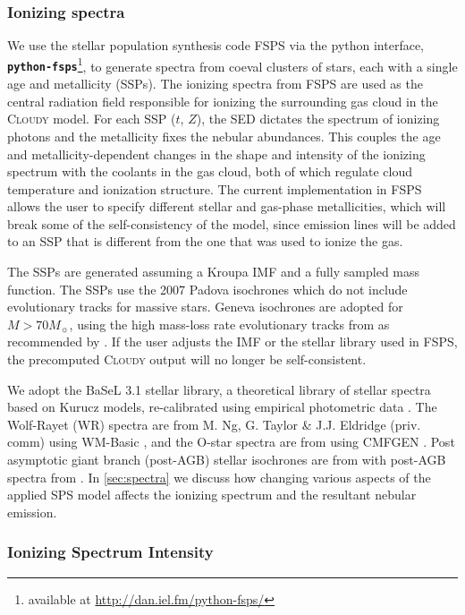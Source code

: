 \documentclass[trackchanges, twocolumn, tighten]{aastex61}
\newcommand{\Sec}[1]{\autoref{sec:#1}}
\newcommand{\FSPS}{{\sc FSPS}\xspace}
\newcommand{\pFSPS}{{\tt \textbf{python-fsps}}\xspace}
\newcommand{\Cloudy}{\textsc{Cloudy}\xspace}
\begin{document}
\subsubsection{Ionizing spectra}\label{sec:methods:cloudy:spectra}

We use the stellar population synthesis code \FSPS via the python interface, \pFSPS\footnote{available at \url{http://dan.iel.fm/python-fsps/}}, to generate spectra from coeval clusters of stars, each with a single age and metallicity (SSPs). The ionizing spectra from \FSPS are used as the central radiation field responsible for ionizing the surrounding gas cloud in the \Cloudy model. For each SSP ($t$, $Z$), the SED dictates the spectrum of ionizing photons and the metallicity fixes the nebular abundances. This couples the age and metallicity-dependent changes in the shape and intensity of the ionizing spectrum with the coolants in the gas cloud, both of which regulate cloud temperature and ionization structure. The current implementation in \FSPS allows the user to specify different stellar and gas-phase metallicities, which will break some of the self-consistency of the model, since emission lines will be added to an SSP that is different from the one that was used to ionize the gas.

The SSPs are generated assuming a Kroupa IMF \citep{Kroupa01} and a fully sampled mass function. The SSPs use the 2007 Padova isochrones \citep{Bertelli94, Girardi00, Marigo08} which do not include evolutionary tracks for massive stars. Geneva isochrones are adopted for $M > 70 M_{\sun}$, using the high mass-loss rate evolutionary tracks from \citep{Schaller92, Meynet00} as recommended by \citet{Levesque10}. If the user adjusts the IMF or the stellar library used in \FSPS, the precomputed \Cloudy output will no longer be self-consistent.

We adopt the BaSeL 3.1 stellar library, a theoretical library of stellar spectra based on Kurucz models, re-calibrated using empirical photometric data \citep{BaSeL}. The Wolf-Rayet (WR) spectra are from M. Ng, G. Taylor \& J.J. Eldridge (priv. comm) using WM-Basic \citep{Pauldrach01}, and the O-star spectra are from \citet{Smith02} using CMFGEN \citep{HillierMiller}. Post asymptotic giant branch (post-AGB) stellar isochrones are from \citet{Vassiliadis} with post-AGB spectra from \citet{Rauch03}. In \Sec{spectra} we discuss how changing various aspects of the applied SPS model affects the ionizing spectrum and the resultant nebular emission.

\subsubsection{Ionizing Spectrum Intensity}\label{sec:methods:cloudy:intensity}
\end{document}

